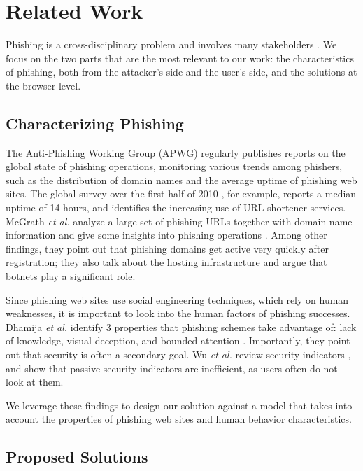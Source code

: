\documentclass[11pt,styles/chicago]{article}
\begin{document}
\section{Related Work} %

Phishing is a cross-disciplinary problem and involves many stakeholders \cite{sheng2009improving}. %
We focus on the two parts that are the most relevant to our work: the characteristics of phishing, both from the attacker's side and the user's side, and the solutions at the browser level.

\subsection{Characterizing Phishing}

The Anti-Phishing Working Group (APWG) regularly publishes reports on the global state of phishing operations, monitoring various trends among phishers, such as the distribution of domain names and the average uptime of phishing web sites. The global survey over the first half of 2010 \cite{apwg2010h1}, for example, reports a median uptime of 14 hours, and identifies the increasing use of URL shortener services. McGrath \emph{et al.} analyze a large set of phishing URLs together with domain name information and give some insights into phishing operations \cite{mcgrath2008behind}. Among other findings, they point out that phishing domains get active very quickly after registration; they also talk about the hosting infrastructure and argue that botnets play a significant role.

Since phishing web sites use social engineering techniques, which rely on human weaknesses, it is important to look into the human factors of phishing successes. Dhamija \emph{et al.} identify 3 properties that phishing schemes take advantage of: lack of knowledge, visual deception, and bounded attention \cite{dhamija2006why}. Importantly, they point out that security is often a secondary goal. Wu \emph{et al.} review security indicators \cite{wu2006security}, and show that passive security indicators are inefficient, as users often do not look at them.

We leverage these findings to design our solution against a model that takes into account the properties of phishing web sites and human behavior characteristics.

\subsection{Proposed Solutions}
\end{document}
